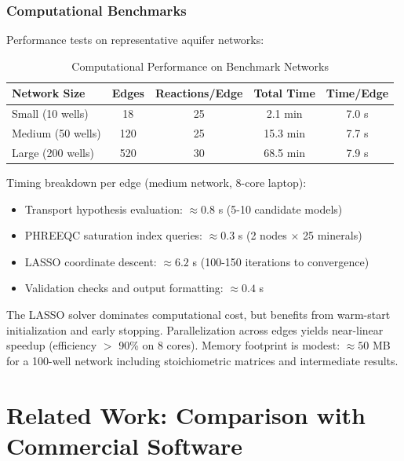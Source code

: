 \documentclass[12pt,a4paper]{article}
\theoremstyle{plain}
\theoremstyle{definition}
\theoremstyle{remark}
\begin{document}
\subsubsection{Computational Benchmarks}

Performance tests on representative aquifer networks:

\begin{table}[htbp]
	\centering
	\caption{Computational Performance on Benchmark Networks}
	\label{tab:performance_benchmarks}
	\begin{tabular}{lcccc}
		\toprule
		\textbf{Network Size} & \textbf{Edges} & \textbf{Reactions/Edge} & \textbf{Total Time} & \textbf{Time/Edge} \\
		\midrule
		Small (10 wells)      & 18             & 25                      & 2.1 min             & 7.0 s              \\
		Medium (50 wells)     & 120            & 25                      & 15.3 min            & 7.7 s              \\
		Large (200 wells)     & 520            & 30                      & 68.5 min            & 7.9 s              \\
		\bottomrule
	\end{tabular}
\end{table}

Timing breakdown per edge (medium network, 8-core laptop):
\begin{itemize}
	\item Transport hypothesis evaluation: $\approx 0.8$ s (5-10 candidate models)
	\item PHREEQC saturation index queries: $\approx 0.3$ s (2 nodes $\times$ 25 minerals)
	\item LASSO coordinate descent: $\approx 6.2$ s (100-150 iterations to convergence)
	\item Validation checks and output formatting: $\approx 0.4$ s
\end{itemize}

The LASSO solver dominates computational cost, but benefits from warm-start initialization and early stopping. Parallelization across edges yields near-linear speedup (efficiency $>$ 90\% on 8 cores). Memory footprint is modest: $\approx 50$ MB for a 100-well network including stoichiometric matrices and intermediate results.
\newpage
\section{Related Work: Comparison with Commercial Software}\label{sec:comparison}
\end{document}
